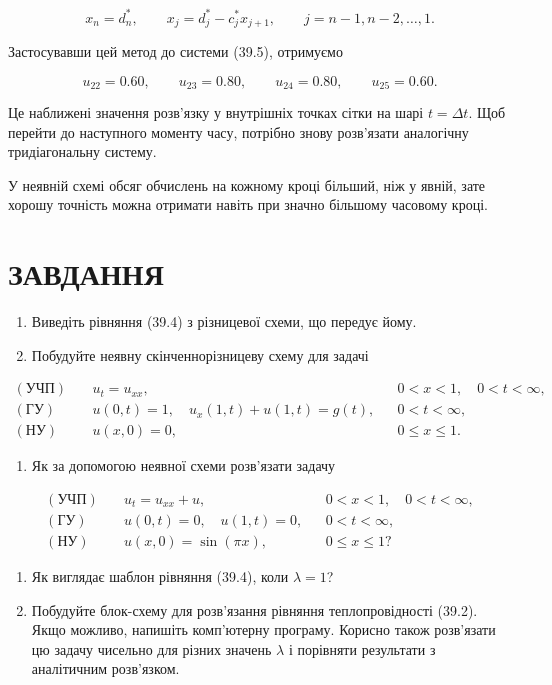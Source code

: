 \documentclass[
  ukrainian,
]{article}
\providecommand{\tightlist}{%
  \setlength{\itemsep}{0pt}\setlength{\parskip}{0pt}}
\begin{document}
\[x_n=d_n^*,\qquad x_j=d_j^*-c_j^*x_{j+1},\qquad j=n-1,n-2,\dots,1.\]

Застосувавши цей метод до системи (39.5), отримуємо

\[u_{22}=0.60,\qquad u_{23}=0.80,\qquad u_{24}=0.80,\qquad u_{25}=0.60.\]

Це наближені значення розв'язку у внутрішніх точках сітки на шарі
\(t=\Delta t\). Щоб перейти до наступного моменту часу, потрібно знову
розв'язати аналогічну тридіагональну систему.

У неявній схемі обсяг обчислень на кожному кроці більший, ніж у явній,
зате хорошу точність можна отримати навіть при значно більшому часовому
кроці.

\section{ЗАВДАННЯ}\label{ux437ux430ux432ux434ux430ux43dux43dux44f-22}

\begin{enumerate}
\def\labelenumi{\arabic{enumi}.}
\item
  Виведіть рівняння (39.4) з різницевої схеми, що передує йому.
\item
  Побудуйте неявну скінченнорізницеву схему для задачі
\end{enumerate}

\[\begin{aligned}(\text{УЧП})\quad & u_t=u_{xx}, && 0<x<1,\quad 0<t<\infty,\\(\text{ГУ})\quad & u(0,t)=1,\quad u_x(1,t)+u(1,t)=g(t), && 0<t<\infty,\\(\text{НУ})\quad & u(x,0)=0, && 0\le x\le 1.\end{aligned}\]

\begin{enumerate}
\def\labelenumi{\arabic{enumi}.}
\setcounter{enumi}{2}
\tightlist
\item
  Як за допомогою неявної схеми розв'язати задачу
\end{enumerate}

\[\begin{aligned}(\text{УЧП})\quad & u_t=u_{xx}+u, && 0<x<1,\quad 0<t<\infty,\\(\text{ГУ})\quad & u(0,t)=0,\quad u(1,t)=0, && 0<t<\infty,\\(\text{НУ})\quad & u(x,0)=\sin(\pi x), && 0\le x\le 1?\end{aligned}\]

\begin{enumerate}
\def\labelenumi{\arabic{enumi}.}
\setcounter{enumi}{3}
\item
  Як виглядає шаблон рівняння (39.4), коли \(\lambda=1\)?
\item
  Побудуйте блок-схему для розв'язання рівняння теплопровідності (39.2).
  Якщо можливо, напишіть комп'ютерну програму. Корисно також розв'язати
  цю задачу чисельно для різних значень \(\lambda\) і порівняти
  результати з аналітичним розв'язком.
\end{enumerate}
\end{document}
